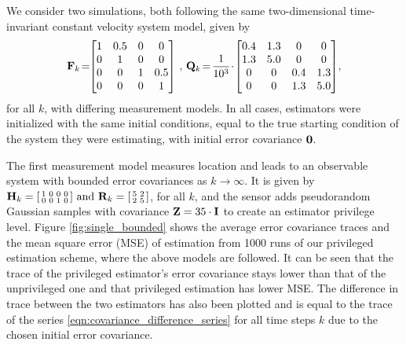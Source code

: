 We consider two simulations, both following the same two-dimensional time-invariant constant velocity system model, given by
\begin{equation*}
   \mat{F}_k\! = \!\!
   \begin{bmatrix}
      1 & 0.5 & 0 & 0\\
      0 & 1 & 0 & 0\\
      0 & 0 & 1 & 0.5\\
      0 & 0 & 0 & 1
   \end{bmatrix}\,,\,
   \mat{Q}_k\! = \!\frac{1}{10^3}\!\cdot\!
   \begin{bmatrix}
      0.4 & 1.3 & 0 & 0\\
      1.3 & 5.0 & 0 & 0\\
      0 & 0 & 0.4 & 1.3\\
      0 & 0 & 1.3 & 5.0
   \end{bmatrix}\!,
\end{equation*}
for all $k$, with differing measurement models. In all cases, estimators were initialized with the same initial conditions, equal to the true starting condition of the system they were estimating, with initial error covariance ${{\mathbf{0}}}$.

The first measurement model measures location and leads to an observable system with bounded error covariances as $k \rightarrow \infty$. It is given by 
$
   {{\mathbf{H}}}_k=
   \begin{bsmallmatrix}
      1 & 0 & 0 & 0\\
      0 & 0 & 1 & 0
   \end{bsmallmatrix}
   \text{ and }
   {\ensuremath{{\mathbf{R}}}}_k=
   \begin{bsmallmatrix}
      5 & 2\\
      2 & 5
   \end{bsmallmatrix}
$, 
for all $k$, and the sensor adds pseudorandom Gaussian samples with covariance ${{\mathbf{Z}}}=35 \cdot {\ensuremath{{\mathbf{I}}}}$ to create an estimator privilege level. Figure \ref{fig:single_bounded} shows the average error covariance traces and the mean square error (MSE) of estimation from 1000 runs of our privileged estimation scheme, where the above models are followed. It can be seen that the trace of the privileged estimator's error covariance stays lower than that of the unprivileged one and that privileged estimation has lower MSE. The difference in trace between the two estimators has also been plotted and is equal to the trace of the series \eqref{eqn:covariance_difference_series} for all time steps $k$ due to the chosen initial error covariance.

